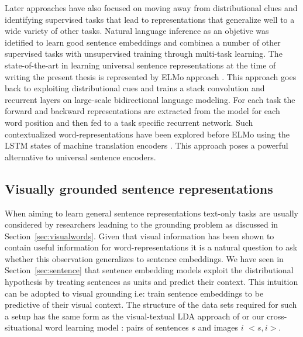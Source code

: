 Later approaches have also focused on moving away from distributional clues
and identifying supervised tasks  that lead to representations that generalize
well to a wide variety of other tasks. Natural language inference as an objetive
was idetified to learn good sentence embeddings \cite{conneau-EtAl:2017:EMNLP2017}
and \cite{subramanian2018learning} combinea a number of other supervised tasks
with unsupervised training through multi-task learning.
The state-of-the-art in learning universal sentence representations at the time of writing the present thesis is
represented by ELMo approach \cite{peters2018deep}. This approach goes back to
exploiting distributional cues and trains a stack convolution and recurrent layers
on large-scale bidirectional language modeling.
For each task the forward and backward representations are extracted from the model
for each word position and then fed to a task specific recurrent network.
Such contextualized word-representations have been explored before ELMo using
the LSTM states of machine translation encoders \cite{mccann2017learned}.
This approach poses a powerful alternative to universal sentence encoders.

\subsection{Visually grounded sentence representations}
\label{sec:visualsentences}

When aiming to learn general sentence representations text-only tasks
are usually considered by researchers leadning to the grounding problem
as discussed in Section~\ref{sec:visualwords}. Given that visual information
has been shown to contain useful information for word-representations it
is a natural question to ask whether this observation generalizes to sentence
embeddings. We have seen in Section~\ref{sec:sentence} that sentence embedding
models exploit the distributional hypothesis by treating sentences as units and
predict their context. This intuition can be adopted to visual grounding i.e:
train sentence embeddings to be predictive of their visual context. The
structure of the data sets required for such a setup has the same form
as the visual-textual LDA approach of \cite{feng2010visual} or our
cross-situational word learning model \cite{kadar2015learning}:
pairs of sentences $s$ and images $i$ $<s, i>$.

